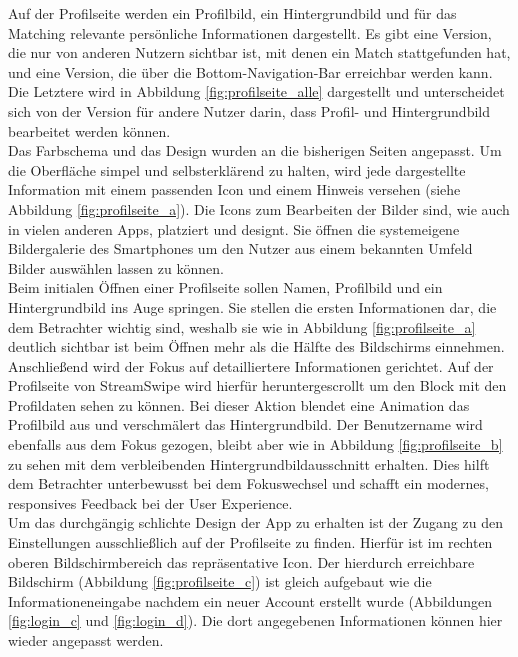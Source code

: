 
Auf der Profilseite werden ein Profilbild, ein Hintergrundbild und für das Matching relevante persönliche Informationen dargestellt. Es gibt eine Version, die nur von anderen Nutzern sichtbar ist, mit denen ein Match stattgefunden hat, und eine Version, die über die Bottom-Navigation-Bar erreichbar werden kann. Die Letztere wird in Abbildung \ref{fig:profilseite_alle} dargestellt und unterscheidet sich von der Version für andere Nutzer darin, dass Profil- und Hintergrundbild bearbeitet werden können.\\
Das Farbschema und das Design wurden an die bisherigen Seiten angepasst. Um die Oberfläche simpel und selbsterklärend zu halten, wird jede dargestellte Information mit einem passenden Icon und einem Hinweis versehen (siehe Abbildung \ref{fig:profilseite_a}). Die Icons zum Bearbeiten der Bilder sind, wie auch in vielen anderen Apps, platziert und designt. Sie öffnen die systemeigene Bildergalerie des Smartphones um den Nutzer aus einem bekannten Umfeld Bilder auswählen lassen zu können.\\
Beim initialen Öffnen einer Profilseite sollen Namen, Profilbild und ein Hintergrundbild ins Auge springen. Sie stellen die ersten Informationen dar, die dem Betrachter wichtig sind, weshalb sie wie in Abbildung \ref{fig:profilseite_a} deutlich sichtbar ist  beim Öffnen mehr als die Hälfte des Bildschirms einnehmen. Anschließend wird der Fokus auf detailliertere Informationen gerichtet. Auf der Profilseite von StreamSwipe wird hierfür heruntergescrollt um den Block mit den Profildaten sehen zu können. Bei dieser Aktion blendet eine Animation das Profilbild aus und verschmälert das Hintergrundbild. Der Benutzername wird ebenfalls aus dem Fokus gezogen, bleibt aber wie in Abbildung \ref{fig:profilseite_b} zu sehen mit dem verbleibenden Hintergrundbildausschnitt erhalten. Dies hilft dem Betrachter unterbewusst bei dem Fokuswechsel und schafft ein modernes, responsives Feedback bei der User Experience.\\
Um das durchgängig schlichte Design der App zu erhalten ist der Zugang zu den Einstellungen ausschließlich auf der Profilseite zu finden. Hierfür ist im rechten oberen Bildschirmbereich das repräsentative Icon. Der hierdurch erreichbare Bildschirm (Abbildung \ref{fig:profilseite_c}) ist gleich aufgebaut wie die Informationeneingabe nachdem ein neuer Account erstellt wurde (Abbildungen \ref{fig:login_c} und \ref{fig:login_d}). Die dort angegebenen Informationen können hier wieder angepasst werden. %


